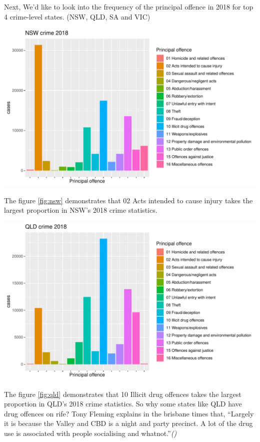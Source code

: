\documentclass[11pt,a4paper,]{article}
\let\origfigure\figure
\let\endorigfigure\endfigure
\renewenvironment{figure}[1][2] {
\expandafter\origfigure\expandafter[H]
} {
\endorigfigure
}
\begin{document}
Next, We'd like to look into the frequency of the principal offence in 2018 for top 4 crime-level states. (NSW, QLD, SA and VIC)

\begin{figure}
\centering
\includegraphics{ETC5513-Assignment4_files/figure-latex/nsw-1.pdf}
\caption{\label{fig:nsw}NSW crime 2018}
\end{figure}

The figure \ref{fig:nsw} demonstrates that 02 Acts intended to cause injury takes the largest proportion in NSW's 2018 crime statistics.

\begin{figure}
\centering
\includegraphics{ETC5513-Assignment4_files/figure-latex/qld-1.pdf}
\caption{\label{fig:qld}QLD crime 2018}
\end{figure}

The figure \ref{fig:qld} demonstrates that 10 Illicit drug offences takes the largest proportion in QLD's 2018 crime statistics. So why some states like QLD have drug offences on rife? Tony Fleming explains in the brisbane times that, ``Largely it is because the Valley and CBD is a night and party precinct. A lot of the drug use is associated with people socialising and whatnot.''\emph{(\textcite{brisbanetimes2019})}
\end{document}
